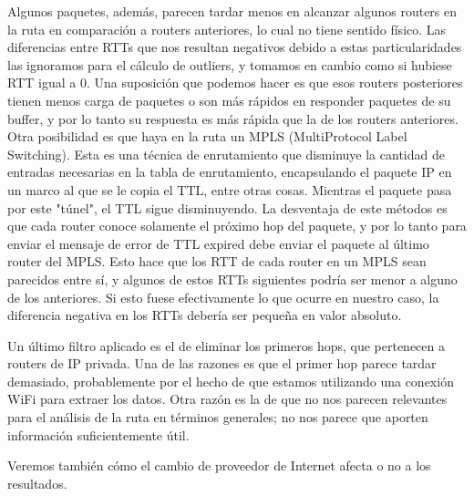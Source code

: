 Algunos paquetes, además, parecen tardar menos en alcanzar algunos routers en la
ruta en comparación a routers anteriores, lo cual no tiene sentido físico. Las
diferencias entre RTTs que nos resultan negativos debido a estas
particularidades las ignoramos para el cálculo de outliers,
y tomamos en cambio como si hubiese RTT igual a
0. Una suposición que podemos hacer es que esos routers posteriores tienen menos
carga de paquetes o son más rápidos en responder paquetes de su buffer, y por lo
tanto su respuesta es más rápida que la de los routers anteriores.
Otra posibilidad es que haya en la ruta un MPLS 
(MultiProtocol Label Switching). Esta es una técnica de enrutamiento que
disminuye la cantidad de entradas necesarias en la tabla de enrutamiento,
encapsulando el paquete IP en un marco al que se le copia el TTL, entre otras
cosas. Mientras el paquete pasa por este "túnel", el TTL sigue disminuyendo.
La desventaja de este métodos es que cada router conoce
solamente el próximo hop del paquete, y por lo tanto para enviar el mensaje
de error de TTL expired debe enviar el paquete
al último router del MPLS. Esto hace que
los RTT de cada router en un MPLS sean parecidos entre sí, y algunos de estos
RTTs siguientes podría ser menor a alguno de los anteriores. Si esto fuese
efectivamente lo que ocurre en nuestro caso,
la diferencia negativa en los RTTs debería ser pequeña en valor absoluto.

Un último filtro aplicado es el de eliminar los primeros hops, que pertenecen
a routers de IP privada. Una de las razones es que el primer hop parece
tardar demasiado, probablemente por el hecho de que estamos utilizando una 
conexión WiFi para extraer los datos. Otra razón es la de que no nos parecen
relevantes para el análisis de la ruta en términos generales; no nos parece que
aporten información suficientemente útil.

Veremos también cómo el cambio de proveedor de Internet afecta o no a los 
resultados.
